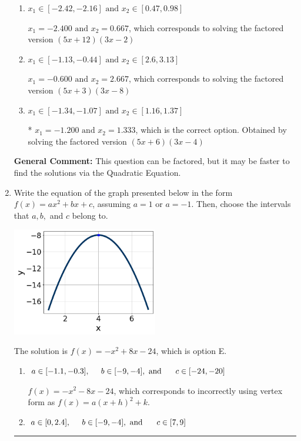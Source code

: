 \documentclass{extbook}[14pt]
\newcommand{\litem}[1]{\item #1

\rule{\textwidth}{0.4pt}}
\begin{document}
\begin{enumerate}
{\begin{enumerate}[label=\Alph*.]
$x_1 = -18.000 \text{ and } x_2 = 20.000$, which corresponds to solving the factored version $(x + 18)(x -20)$
\item \( x_1 \in [-2.42, -2.16] \text{ and } x_2 \in [0.47, 0.98] \)

$x_1 = -2.400 \text{ and } x_2 = 0.667$, which corresponds to solving the factored version $(5x + 12)(3x -2)$
\item \( x_1 \in [-1.13, -0.44] \text{ and } x_2 \in [2.6, 3.13] \)

$x_1 = -0.600 \text{ and } x_2 = 2.667$, which corresponds to solving the factored version $(5x + 3)(3x -8)$
\item \( x_1 \in [-1.34, -1.07] \text{ and } x_2 \in [1.16, 1.37] \)

* $x_1 = -1.200 \text{ and } x_2 = 1.333$, which is the correct option. Obtained by solving the factored version $(5x + 6)(3x -4)$
\end{enumerate}

\textbf{General Comment:} This question can be factored, but it may be faster to find the solutions via the Quadratic Equation.
}
\litem{
Write the equation of the graph presented below in the form $f(x)=ax^2+bx+c$, assuming  $a=1$ or $a=-1$. Then, choose the intervals that $a, b,$ and $c$ belong to.

\begin{center}
    \includegraphics[width=0.5\textwidth]{../Figures/quadraticGraphToEquationCopyA.png}
\end{center}


The solution is \( f(x) = -x^{2} +8 x -24 \), which is option E.\begin{enumerate}[label=\Alph*.]
\item \( a \in [-1.1, -0.3], \hspace*{5mm} b \in [-9, -4], \text{ and } \hspace*{5mm} c \in [-24, -20] \)

$f(x)=-x^{2} -8 x -24$, which corresponds to incorrectly using vertex form as $f(x) = a(x+h)^2+k$.
\item \( a \in [0, 2.4], \hspace*{5mm} b \in [-9, -4], \text{ and } \hspace*{5mm} c \in [7, 9] \)


\end{enumerate}}
\end{enumerate}
\end{document}
